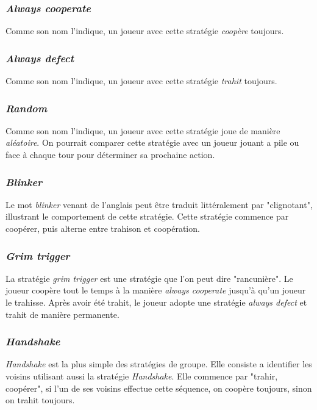 \documentclass[a4paper]{article}
\begin{document}
\subsubsection{\textit{Always cooperate}}
Comme son nom l'indique, un joueur avec cette stratégie \textit{coopère} toujours.

\subsubsection{\textit{Always defect}}
Comme son nom l'indique, un joueur avec cette stratégie \textit{trahit} toujours.

\subsubsection{\textit{Random}}
Comme son nom l'indique, un joueur avec cette stratégie joue de manière \textit{aléatoire}. On pourrait comparer cette stratégie avec un joueur jouant a pile ou face à chaque tour pour déterminer sa prochaine action.

\subsubsection{\textit{Blinker}}
Le mot \textit{blinker} venant de l'anglais peut être traduit littéralement par "clignotant", illustrant le comportement de cette stratégie. Cette stratégie commence par coopérer, puis alterne entre trahison et coopération.

\subsubsection{\textit{Grim trigger}}
La stratégie \textit{grim trigger} est une stratégie que l'on peut dire "rancunière". Le joueur coopère tout le temps à la manière \textit{always cooperate} jusqu'à qu'un joueur le trahisse. Après avoir été trahit, le joueur adopte une stratégie \textit{always defect} et trahit de manière permanente.

\subsubsection{\textit{Handshake}}
\textit{Handshake} est la plus simple des stratégies de groupe. Elle consiste a identifier les voisins utilisant aussi la stratégie \textit{Handshake}. Elle commence par "trahir, coopérer", si l'un de ses voisins effectue cette séquence, on coopère toujours, sinon on trahit toujours.
\end{document}
